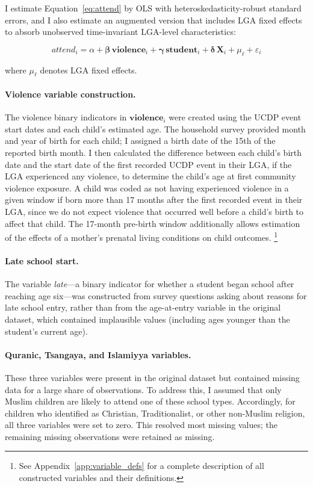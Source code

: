 I estimate Equation~\eqref{eq:attend} by OLS with heteroskedasticity-robust
standard errors, and I also estimate an augmented version that includes LGA
fixed effects to absorb unobserved time-invariant LGA-level characteristics:

\begin{equation}
    \label{eq:attend_fe}
    \textit{attend}_{i} = \alpha + \boldsymbol{\beta}\,\mathbf{violence}_{i}
        + \boldsymbol{\gamma}\,\mathbf{student}_{i}
        + \boldsymbol{\delta}\,\mathbf{X}_{i}
        + \mu_{\ell} + \varepsilon_{i}
\end{equation}

\noindent where $\mu_{\ell}$ denotes LGA fixed effects.

\paragraph{Violence variable construction.}
The violence binary indicators in $\mathbf{violence}_{i}$ were created using
the UCDP event start dates and each child's estimated age. The household
survey provided month and year of birth for each child; I assigned a birth
date of the 15th of the reported birth month. I then calculated the
difference between each child's birth date and the start date of the first
recorded UCDP event in their LGA, if the LGA experienced any violence, to
determine the child's age at first community violence exposure. A child was
coded as not having experienced violence in a given window if born more than
17 months after the first recorded event in their LGA, since we do not
expect violence that occurred well before a child's birth to affect that
child. The 17-month pre-birth window additionally allows estimation of the
effects of a mother's prenatal living conditions on child outcomes.%
\footnote{See Appendix~\ref{app:variable_defs} for a complete description of
all constructed variables and their definitions.}

\paragraph{Late school start.}
The variable \textit{late}---a binary indicator for whether a student began
school after reaching age six---was constructed from survey questions asking
about reasons for late school entry, rather than from the age-at-entry
variable in the original dataset, which contained implausible values
(including ages younger than the student's current age).

\paragraph{Quranic, Tsangaya, and Islamiyya variables.}
These three variables were present in the original dataset but contained
missing data for a large share of observations. To address this, I assumed
that only Muslim children are likely to attend one of these school types.
Accordingly, for children who identified as Christian, Traditionalist, or
other non-Muslim religion, all three variables were set to zero. This
resolved most missing values; the remaining missing observations were
retained as missing.

